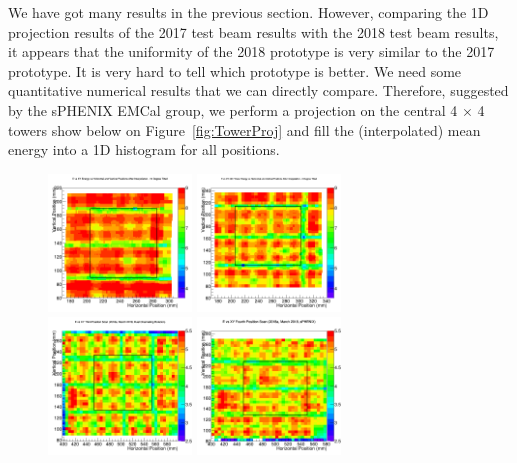 \documentclass[hidelinks,11pt]{article}
\numberwithin{figure}{section}
\numberwithin{table}{section}
\begin{document}
We have got many results in the previous section. However, comparing the 1D projection results of the 2017 test beam results with the 2018 test beam results, it appears that the uniformity of the 2018 prototype is very similar to the 2017 prototype. It is very hard to tell which prototype is better. We need some quantitative numerical results that we can directly compare. Therefore, suggested by the sPHENIX EMCal group, we perform a projection on the central 4 $\times$ 4 towers show below on Figure~\ref{fig:TowerProj} and fill the (interpolated) mean energy into a 1D histogram for all positions. 
\begin{figure}[hbtp]

\begin{center}
\includegraphics[width=0.34\textwidth]{Plots/2017/2nd/ProjectionRange.png}
\includegraphics[width=0.34\textwidth]{Plots/2017/3rd/ProjectionRange.png}
\includegraphics[width=0.34\textwidth]{Plots/2018/3rd/ProjectionRange.png}
\includegraphics[width=0.34\textwidth]{Plots/2018/4th/ProjectionRange.png}

\end{center}
\end{figure}
\end{document}
